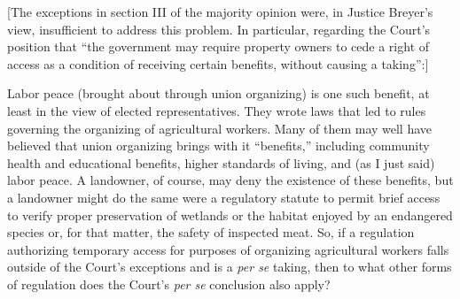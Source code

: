 %
%

[The exceptions in section III of the majority opinion were, in Justice Breyer's
view, insufficient to address this problem. In particular, regarding the Court's
position that ``the government may require property owners to cede a right of
access as a condition of receiving certain benefits, without causing a
taking'':]

Labor peace (brought about through union organizing) is one such benefit, at
least in the view of elected representatives. They wrote laws that led to rules
governing the organizing of agricultural workers. Many of them may well have
believed that union organizing brings with it ``benefits,'' including community
health and educational benefits, higher standards of living, and (as I just
said) labor peace.
A landowner, of course, may deny the
existence of these benefits, but a landowner might do the same were a regulatory
statute to permit brief access to verify proper preservation of wetlands or the
habitat enjoyed by an endangered species or, for that matter, the safety of
inspected meat. So, if a regulation authorizing temporary access for purposes of
organizing agricultural workers falls outside of the Court's exceptions and is a
\textit{per se} taking, then to what other forms of regulation does the Court's
\textit{per se} conclusion also apply?


